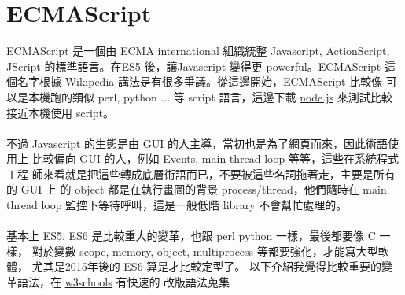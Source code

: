 \section{ECMAScript}
ECMAScript 是一個由 ECMA international 組織統整 Javascript, ActionScript,
JScript 的標準語言。在ES5 後，讓Javascript 變得更 powerful。ECMAScript
這個名字根據 Wikipedia 講法是有很多爭議。從這邊開始，ECMAScript 比較像
可以是本機跑的類似 perl, python ... 等 script 語言，這邊下載
\href{https://nodejs.org}{node.js} 來測試比較接近本機使用 script。
\\\\
不過 Javascript 的生態是由 GUI 的人主導，當初也是為了網頁而來，因此術語使用上
比較偏向 GUI 的人，例如 Events, main thread loop 等等，這些在系統程式工程
師來看就是把這些轉成底層術語而已，不要被這些名詞拖著走，主要是所有的 GUI 上
的 object 都是在執行畫圖的背景 process/thread，他們隨時在 main thread loop
監控下等待呼叫，這是一般低階 library 不會幫忙處理的。
\\\\
基本上 ES5, ES6 是比較重大的變革，也跟 perl python 一樣，最後都要像 C 一樣，
對於變數 scope, memory, object, multiprocess 等都要強化，才能寫大型軟體，
尤其是2015年後的 ES6 算是才比較定型了。 以下介紹我覺得比較重要的變革語法，在
\href{https://www.w3schools.com/js/js_versions.asp}{w3schools} 有快速的
改版語法蒐集
